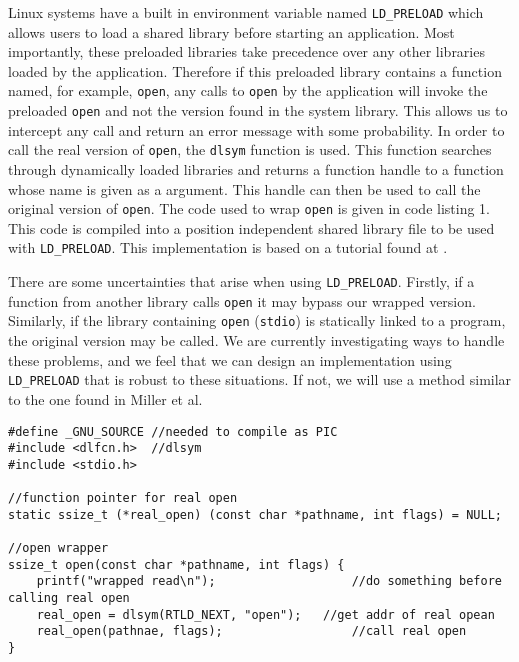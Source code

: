 \documentclass[10pt]{article}
\begin{document}
Linux systems have a built in environment variable named \texttt{LD\_PRELOAD} which allows users to load a shared library before starting an application. Most importantly, these preloaded libraries take precedence over any other libraries loaded by the application. Therefore if this preloaded library contains a function named, for example, \texttt{open}, any calls to \texttt{open} by the application will invoke the preloaded \texttt{open} and not the version found in the system library. This allows us to intercept any call and return an error message with some probability. In order to call the real version of \texttt{open}, the \texttt{dlsym} function is used. This function searches through dynamically loaded libraries and returns a function handle to a function whose name is given as a argument. This handle can then be used to call the original version of \texttt{open}. The code used to wrap \texttt{open} is given in code listing 1. This code is compiled into a position independent shared library file to be used with \texttt{LD\_PRELOAD}. This implementation is based on a tutorial found at \cite{preload}.

There are some uncertainties that arise when using \texttt{LD\_PRELOAD}. Firstly, if a function from another library calls \texttt{open} it may bypass our wrapped version. Similarly, if the library containing \texttt{open} (\texttt{stdio}) is statically linked to a program, the original version may be called. We are currently investigating ways to handle these problems, and we feel that we can design an implementation using \texttt{LD\_PRELOAD} that is robust to these situations. If not, we will use a method similar to the one found in Miller et al.
\pagebreak
\begin{lstlisting}[caption=\texttt{open} wrapper]
#define _GNU_SOURCE	//needed to compile as PIC
#include <dlfcn.h>	//dlsym
#include <stdio.h>

//function pointer for real open
static ssize_t (*real_open) (const char *pathname, int flags) = NULL;

//open wrapper
ssize_t open(const char *pathname, int flags) {
	printf("wrapped read\n");					//do something before calling real open
	real_open = dlsym(RTLD_NEXT, "open"); 	//get addr of real opean
	real_open(pathnae, flags);					//call real open
}
\end{lstlisting}

\end{document}

